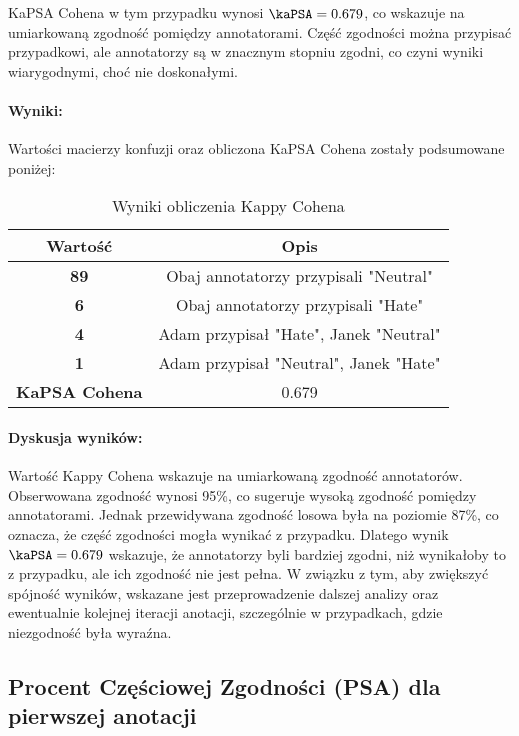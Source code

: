 \documentclass[12pt]{article}
\begin{document}
KaPSA Cohena w tym przypadku wynosi \( \kaPSA = 0.679 \), co wskazuje na umiarkowaną zgodność pomiędzy annotatorami. Część zgodności można przypisać przypadkowi, ale annotatorzy są w znacznym stopniu zgodni, co czyni wyniki wiarygodnymi, choć nie doskonałymi.

\paragraph{Wyniki:}
Wartości macierzy konfuzji oraz obliczona KaPSA Cohena zostały podsumowane poniżej:

\begin{table}[h!]
\centering
\begin{tabular}{|c|c|}
\hline
\textbf{Wartość}      & \textbf{Opis}                        \\ \hline
\textbf{89}           & Obaj annotatorzy przypisali "Neutral" \\ \hline
\textbf{6}            & Obaj annotatorzy przypisali "Hate"    \\ \hline
\textbf{4}            & Adam przypisał "Hate", Janek "Neutral" \\ \hline
\textbf{1}            & Adam przypisał "Neutral", Janek "Hate" \\ \hline
\textbf{KaPSA Cohena} & 0.679                                 \\ \hline
\end{tabular}
\caption{Wyniki obliczenia Kappy Cohena}
\end{table}

\paragraph{Dyskusja wyników:}
Wartość Kappy Cohena wskazuje na umiarkowaną zgodność annotatorów. Obserwowana zgodność wynosi 95\%, co sugeruje wysoką zgodność pomiędzy annotatorami. Jednak przewidywana zgodność losowa była na poziomie 87\%, co oznacza, że część zgodności mogła wynikać z przypadku. Dlatego wynik \( \kaPSA = 0.679 \) wskazuje, że annotatorzy byli bardziej zgodni, niż wynikałoby to z przypadku, ale ich zgodność nie jest pełna. W związku z tym, aby zwiększyć spójność wyników, wskazane jest przeprowadzenie dalszej analizy oraz ewentualnie kolejnej iteracji anotacji, szczególnie w przypadkach, gdzie niezgodność była wyraźna.



\subsection{Procent Częściowej Zgodności (PSA) dla pierwszej anotacji}
\end{document}
